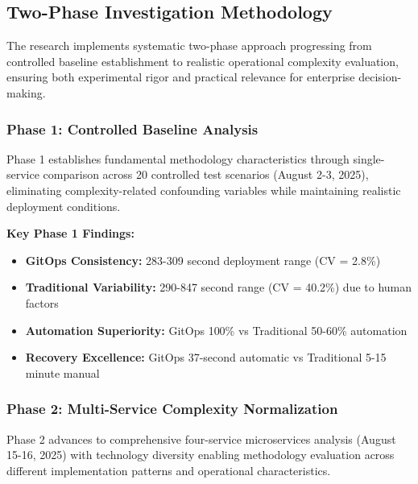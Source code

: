 \subsection{Two-Phase Investigation Methodology}
\label{subsec:investigation_methodology}

The research implements systematic two-phase approach progressing from controlled baseline establishment to realistic operational complexity evaluation, ensuring both experimental rigor and practical relevance for enterprise decision-making.

\subsubsection{Phase 1: Controlled Baseline Analysis}

Phase 1 establishes fundamental methodology characteristics through single-service comparison across 20 controlled test scenarios (August 2-3, 2025), eliminating complexity-related confounding variables while maintaining realistic deployment conditions.

\textbf{Key Phase 1 Findings:}
\begin{itemize}
\item \textbf{GitOps Consistency:} 283-309 second deployment range (CV = 2.8\%)
\item \textbf{Traditional Variability:} 290-847 second range (CV = 40.2\%) due to human factors
\item \textbf{Automation Superiority:} GitOps 100\% vs Traditional 50-60\% automation
\item \textbf{Recovery Excellence:} GitOps 37-second automatic vs Traditional 5-15 minute manual
\end{itemize}

\subsubsection{Phase 2: Multi-Service Complexity Normalization}

Phase 2 advances to comprehensive four-service microservices analysis (August 15-16, 2025) with technology diversity enabling methodology evaluation across different implementation patterns and operational characteristics.

